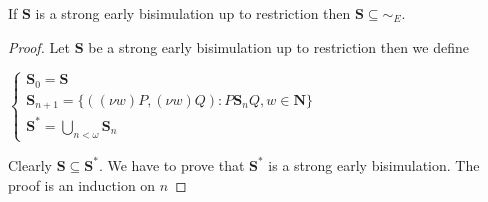 \begin{proposition}
  If $\mathbf{S}$ is a strong early bisimulation up to restriction then $\mathbf{S} \subseteq \sim_{E}$.
  \begin{proof}
    Let $\mathbf{S}$ be a strong early bisimulation up to restriction then we define
    \begin{center}
      $\left\{\begin{array}{l}
	  \mathbf{S}_{0} = \mathbf{S}
	\\
	  \mathbf{S}_{n+1}=\{((\nu w)P, (\nu w)Q): P\mathbf{S}_{n}Q, w\in \mathbf{N}\}
	\\
	  \mathbf{S}^{*}= \bigcup_{n<\omega} \mathbf{S}_{n}
       \end{array}\right.$
    \end{center}
    Clearly $\mathbf{S} \subseteq \mathbf{S}^{*}$. We have to prove that $\mathbf{S}^{*}$ is a strong early bisimulation. The proof is an induction on $n$
  \end{proof}
\end{proposition}


